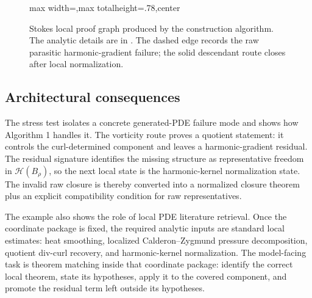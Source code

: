 \documentclass[11pt]{article}
\theoremstyle{plain}
\theoremstyle{definition}
\theoremstyle{remark}
\newcommand{\calH}{\mathcal H}
\begin{document}
\begin{figure}[H]
\begin{adjustbox}{max width=\linewidth,max totalheight=.78\textheight,center}
\end{adjustbox}
\caption{Stokes local proof graph produced by the construction algorithm.  The
analytic details are in .  The dashed edge records the
raw parasitic harmonic-gradient failure; the solid descendant route closes
after local normalization.}
\label{fig:stokes-local-routing}
\end{figure}

\subsection{Architectural consequences}
The stress test isolates a concrete generated-PDE failure mode and shows how
Algorithm 1 handles it.  The vorticity route proves a quotient statement: it
controls the curl-determined component and leaves a harmonic-gradient residual.
The residual signature identifies the missing structure as representative
freedom in \(\calH(B_\rho)\), so the next local state is the
harmonic-kernel normalization state.  The invalid raw closure is thereby
converted into a normalized closure theorem plus an explicit compatibility
condition for raw representatives.

The example also shows the role of local PDE literature retrieval.  Once the
coordinate package is fixed, the required analytic inputs are standard local
estimates: heat smoothing, localized Calderon--Zygmund pressure decomposition,
quotient div-curl recovery, and harmonic-kernel normalization.  The
model-facing task is theorem matching inside that coordinate package: identify
the correct local theorem, state its hypotheses, apply it to the covered
component, and promote the residual term left outside its hypotheses.
\end{document}
